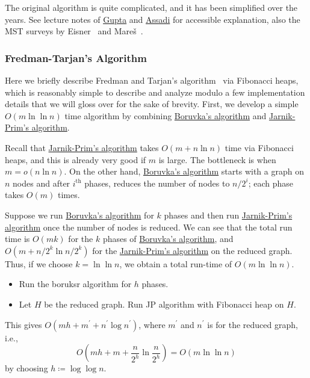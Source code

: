 \begin{remark}
	The original algorithm is quite complicated, and it has been simplified over the years. See lecture notes of \href{https://www.cs.cmu.edu/~15850/notes/lec1.pdf}{Gupta} and \href{https://sepehr.assadi.info/courses/cs860-w24/Lectures/lec1.pdf}{Assadi} for accessible explanation, also the MST surveys by Eisner~\cite{eisner1997state} and Mareš~\cite{marevs2008saga}.
\end{remark}

\subsubsection{Fredman-Tarjan's Algorithm}
Here we briefly describe Fredman and Tarjan's algorithm~\cite{fredman1987fibonacci,marevs2008saga} via Fibonacci heaps, which is reasonably simple to describe and analyze modulo a few implementation details that we will gloss over for the sake of brevity. First, we develop a simple \(O(m \ln \ln n)\) time algorithm by combining \hyperref[algo:Boruvka]{Boruvka's algorithm} and \hyperref[algo:Jarnik-Prim]{Jarnik-Prim's algorithm}.

Recall that \hyperref[algo:Jarnik-Prim]{Jarnik-Prim's algorithm} takes \(O(m + n \ln n)\) time via Fibonacci heaps, and this is already very good if \(m\) is large. The bottleneck is when \(m = o(n \ln n)\). On the other hand, \hyperref[algo:Boruvka]{Boruvka's algorithm} starts with a graph on \(n\) nodes and after \(i^{\text{th} }\) phases, reduces the number of nodes to \(n / 2^i\); each phase takes \(O(m)\) times.

\begin{intuition}
	Suppose we run \hyperref[algo:Boruvka]{Boruvka's algorithm} for \(k\) phases and then run \hyperref[algo:Jarnik-Prim]{Jarnik-Prim's algorithm} once the number of nodes is reduced. We can see that the total run time is \(O(m k)\) for the \(k\) phases of \hyperref[algo:Boruvka]{Boruvka's algorithm}, and \(O(m + n / 2^k \ln n / 2^k)\) for the \hyperref[algo:Jarnik-Prim]{Jarnik-Prim's algorithm} on the reduced graph. Thus, if we choose \(k = \ln \ln n\), we obtain a total run-time of \(O(m \ln \ln n)\).

	\begin{itemize}
		\item Run the boruksr algorithm for \(h\) phases.
		\item Let \(H\) be the reduced graph. Run JP algorithm with Fibonacci heap on \(H\).
	\end{itemize}
	This gives \(O(mh + m^{\prime} + n^{\prime} \log n^{\prime} )\), where \(m^{\prime} \) and \(n^{\prime} \) is for the reduced graph, i.e.,
	\[
		O \left( mh + m + \frac{n}{2^h} \ln \frac{n}{2^h} \right)
		= O(m \ln \ln n)
	\]
	by choosing \(h \coloneqq \log \log n\).
\end{intuition}


